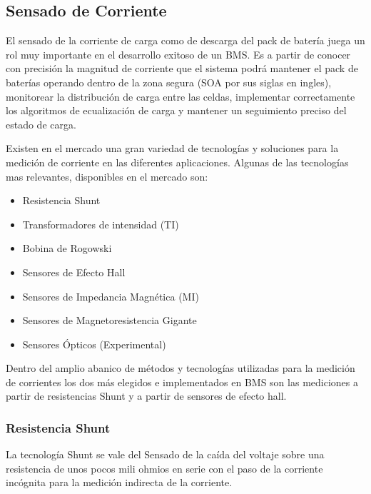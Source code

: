 \documentclass[10pt,a4paper]{article}
\begin{document}
	
	\subsection{Sensado de Corriente}
	
	El sensado de la corriente de carga como de descarga del 
    pack de batería juega un rol muy importante en el desarrollo exitoso de un 
    BMS. Es a partir de conocer con precisión la magnitud de corriente que el 
    sistema podrá mantener el pack de baterías operando dentro de la zona 
    segura (SOA por sus siglas en ingles), monitorear la distribución de carga 
    entre las celdas, implementar correctamente los algoritmos de ecualización 
    de carga y mantener un seguimiento preciso del estado de carga.
	
	\noindent Existen en el mercado una gran variedad de tecnologías y 
    soluciones para la medición de corriente en las diferentes aplicaciones. 
    Algunas de las tecnologías mas relevantes, disponibles en el mercado son:
	\begin{itemize}
		\item [] Resistencia Shunt
		\item [] Transformadores de intensidad (TI)
		\item [] Bobina de Rogowski 
		\item [] Sensores de Efecto Hall
		\item [] Sensores de Impedancia Magnética (MI)
		\item [] Sensores de Magnetoresistencia Gigante 
		\item [] Sensores Ópticos (Experimental)
	\end{itemize}
	
	\noindent Dentro del amplio abanico de métodos y tecnologías utilizadas 
    para la medición de corrientes los dos más elegidos e implementados en 
    BMS son las mediciones a partir de resistencias Shunt y a partir de sensores 
    de efecto hall.
	
	\subsubsection{Resistencia Shunt}

	\noindent La tecnología Shunt se vale del Sensado de la caída del voltaje 
    sobre una resistencia de unos pocos mili ohmios en serie con el paso de la 
    corriente incógnita para la medición indirecta de la corriente.
	
\end{document}
